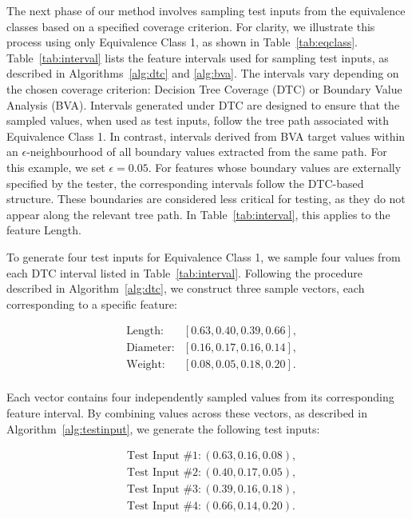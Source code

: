 \documentclass[
]{ceurart}
\theoremstyle{definition}
\begin{document}
The next phase of our method involves sampling test inputs from the equivalence classes based on a specified coverage criterion. For clarity, we illustrate this process using only Equivalence Class 1, as shown in Table~\ref{tab:eqclass}. Table~\ref{tab:interval} lists the feature intervals used for sampling test inputs, as described in Algorithms~\ref{alg:dtc} and \ref{alg:bva}. The intervals vary depending on the chosen coverage criterion: Decision Tree Coverage (DTC) or Boundary Value Analysis (BVA). Intervals generated under DTC are designed to ensure that the sampled values, when used as test inputs, follow the tree path associated with Equivalence Class 1. In contrast, intervals derived from BVA target values within an $\epsilon$-neighbourhood of all boundary values extracted from the same path. For this example, we set $\epsilon = 0.05$. For features whose boundary values are externally specified by the tester, the corresponding intervals follow the DTC-based structure. These boundaries are considered less critical for testing, as they do not appear along the relevant tree path. In Table~\ref{tab:interval}, this applies to the feature Length.

To generate four test inputs for Equivalence Class 1, we sample four values from each DTC interval listed in Table~\ref{tab:interval}. Following the procedure described in Algorithm~\ref{alg:dtc}, we construct three sample vectors, each corresponding to a specific feature:

\begin{equation*}
\begin{aligned}
& \text{Length}:&[0.63, 0.40, 0.39, 0.66] , \\
& \text{Diameter}:&[0.16, 0.17, 0.16, 0.14] , \\
& \text{Weight}:&[0.08, 0.05, 0.18, 0.20] . \\
\end{aligned}
\end{equation*}

Each vector contains four independently sampled values from its corresponding feature interval. By combining values across these vectors, as described in Algorithm~\ref{alg:testinput}, we generate the following test inputs:

\begin{equation*}
\begin{aligned}
& \text{Test Input \#1}: (0.63, 0.16, 0.08) , \\
& \text{Test Input \#2}: (0.40, 0.17, 0.05) , \\
& \text{Test Input \#3}: (0.39, 0.16, 0.18) , \\
& \text{Test Input \#4}: (0.66, 0.14, 0.20) . \\
\end{aligned}
\end{equation*}
\end{document}
